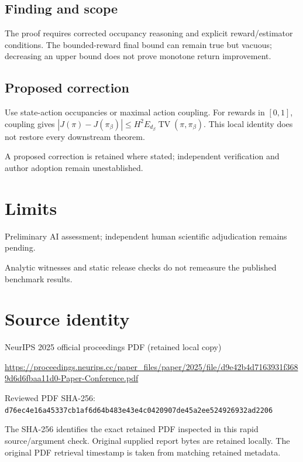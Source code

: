 \documentclass[11pt]{article}
\begin{document}
\subsection*{Finding and scope}

The proof requires corrected occupancy reasoning and explicit reward/estimator conditions. The bounded-reward final bound can remain true but vacuous; decreasing an upper bound does not prove monotone return improvement.

\subsection*{Proposed correction}

Use state-action occupancies or maximal action coupling. For rewards in \([0,1]\), coupling gives \(|J(\pi)-J(\pi_\beta)|\le H^2E_{d_\beta}\operatorname{TV}(\pi,\pi_\beta)\). This local identity does not restore every downstream theorem.

A proposed correction is retained where stated; independent verification and author adoption remain unestablished.

\section*{Limits}

Preliminary AI assessment; independent human scientific adjudication remains pending.\par

Analytic witnesses and static release checks do not remeasure the published benchmark results.\par

\section*{Source identity}

NeurIPS 2025 official proceedings PDF (retained local copy)

\url{https://proceedings.neurips.cc/paper_files/paper/2025/file/d9e42b4d7163931f3689d6d6fbaa11d0-Paper-Conference.pdf}

Reviewed PDF SHA-256: \nolinkurl{d76ec4e16a45337cb1af6d64b483e43e4c0420907de45a2ee524926932ad2206}

The SHA-256 identifies the exact retained PDF inspected in this rapid source/argument check. Original supplied report bytes are retained locally. The original PDF retrieval timestamp is taken from matching retained metadata.
\end{document}
